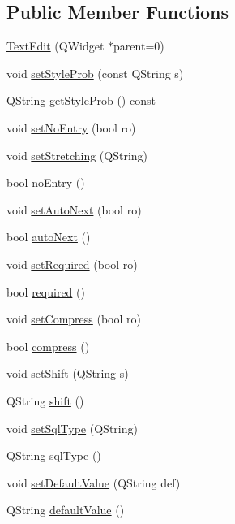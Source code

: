 \subsection*{Public Member Functions}
\begin{DoxyCompactItemize}
\item 
\hyperlink{classTextEdit_a32f19da5c4b8a0fd0d4404f21a1ea2db}{TextEdit} (QWidget $\ast$parent=0)
\item 
void \hyperlink{classTextEdit_a9eea0ae1656a97e0aed27845208c4fab}{setStyleProb} (const QString s)
\item 
QString \hyperlink{classTextEdit_a3147fc4e007085974cac47c585df814a}{getStyleProb} () const 
\item 
void \hyperlink{classTextEdit_ad0e073cb401a62c9b735dd08805c0241}{setNoEntry} (bool ro)
\item 
void \hyperlink{classTextEdit_abaea4e3a388e74d977b08fefb9c01bf7}{setStretching} (QString)
\item 
bool \hyperlink{classTextEdit_ab500a8532f1568e95f830a38f79fb611}{noEntry} ()
\item 
void \hyperlink{classTextEdit_a14559831223953fa39a368476e53a4e3}{setAutoNext} (bool ro)
\item 
bool \hyperlink{classTextEdit_a159d66c747d3f80b8d5278c5fe1f42b6}{autoNext} ()
\item 
void \hyperlink{classTextEdit_a09621dec53780f88ab82ec889a142c95}{setRequired} (bool ro)
\item 
bool \hyperlink{classTextEdit_a4021ff52966176c34ddb48428cbed791}{required} ()
\item 
void \hyperlink{classTextEdit_a4ea5c6a7a0ec352bec116e97c2903b40}{setCompress} (bool ro)
\item 
bool \hyperlink{classTextEdit_ab1409dcc0b1c7dc68fb84605182ae560}{compress} ()
\item 
void \hyperlink{classTextEdit_a5012d65f42f587c52f78565ded25456c}{setShift} (QString s)
\item 
QString \hyperlink{classTextEdit_a45a2ad900d258ac136c0ee5bf3e89395}{shift} ()
\item 
void \hyperlink{classTextEdit_aa6f4f6bd66d00cf3dbb8d65d3337d692}{setSqlType} (QString)
\item 
QString \hyperlink{classTextEdit_acbaf6ae2738e68085c55c293678b4191}{sqlType} ()
\item 
void \hyperlink{classTextEdit_abee055ec499e7d78a0d7e80e809aacd2}{setDefaultValue} (QString def)
\item 
QString \hyperlink{classTextEdit_ac09986fd66505835e21be13c68e6d269}{defaultValue} ()

\end{DoxyCompactItemize}
